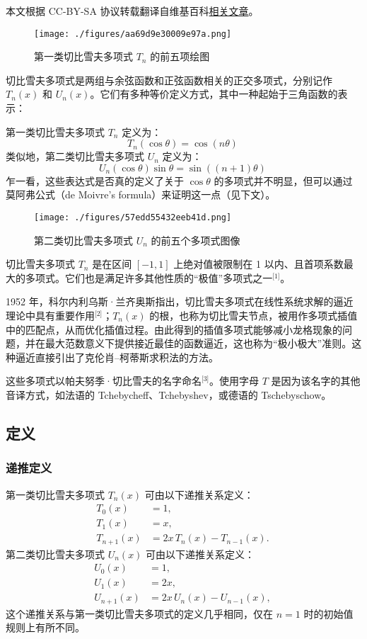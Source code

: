 
本文根据 CC-BY-SA 协议转载翻译自维基百科\href{https://en.wikipedia.org/wiki/Hermann_von_Helmholtz}{相关文章}。

\begin{figure}[ht]
\centering
\texttt{[image: ./figures/aa69d9e30009e97a.png]}
\caption{第一类切比雪夫多项式 $T_n$ 的前五项绘图} \label{fig_QBXFdx_1}
\end{figure}
切比雪夫多项式是两组与余弦函数和正弦函数相关的正交多项式，分别记作 $T_n(x)$ 和 $U_n(x)$。它们有多种等价定义方式，其中一种起始于三角函数的表示：

第一类切比雪夫多项式 $T_n$ 定义为：
$$
T_n(\cos \theta) = \cos(n\theta)~
$$
类似地，第二类切比雪夫多项式 $U_n$ 定义为：
$$
U_n(\cos \theta)\sin \theta = \sin((n+1)\theta)~
$$
乍一看，这些表达式是否真的定义了关于 $\cos \theta$ 的多项式并不明显，但可以通过莫阿弗公式（de Moivre’s formula）来证明这一点（见下文）。
\begin{figure}[ht]
\centering
\texttt{[image: ./figures/57edd55432eeb41d.png]}
\caption{第二类切比雪夫多项式 $U_n$ 的前五个多项式图像} \label{fig_QBXFdx_2}
\end{figure}
切比雪夫多项式 $T_n$ 是在区间 $[-1, 1]$ 上绝对值被限制在 1 以内、且首项系数最大的多项式。它们也是满足许多其他性质的“极值”多项式之一\(^\text{[1]}\)。

1952 年，科尔内利乌斯·兰齐奥斯指出，切比雪夫多项式在线性系统求解的逼近理论中具有重要作用\(^\text{[2]}\)；$T_n(x)$ 的根，也称为切比雪夫节点，被用作多项式插值中的匹配点，从而优化插值过程。由此得到的插值多项式能够减小龙格现象的问题，并在最大范数意义下提供接近最佳的函数逼近，这也称为“极小极大”准则。这种逼近直接引出了克伦肖–柯蒂斯求积法的方法。

这些多项式以帕夫努季·切比雪夫的名字命名\(^\text{[3]}\)。使用字母 $T$ 是因为该名字的其他音译方式，如法语的 Tchebycheff、Tchebyshev，或德语的 Tschebyschow。
\subsection{定义}
\subsubsection{递推定义}
第一类切比雪夫多项式 $T_n(x)$ 可由以下递推关系定义：
$$
\begin{aligned}
T_0(x) &= 1, \\
T_1(x) &= x, \\
T_{n+1}(x) &= 2x \, T_n(x) - T_{n-1}(x).
\end{aligned}~
$$
第二类切比雪夫多项式 $U_n(x)$ 可由以下递推关系定义：
$$
\begin{aligned}
U_0(x) &= 1, \\
U_1(x) &= 2x, \\
U_{n+1}(x) &= 2x \, U_n(x) - U_{n-1}(x),
\end{aligned}~
$$
这个递推关系与第一类切比雪夫多项式的定义几乎相同，仅在 $n = 1$ 时的初始值规则上有所不同。
